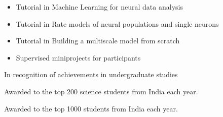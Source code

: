 \documentclass[10pt,a4paper]{altacv}
\begin{document}



\begin{itemize}
\item Tutorial in Machine Learning for neural data analysis 
\item Tutorial in Rate models of neural populations and single neurons
\item Tutorial in Building a multiscale model from scratch
\item Supervised miniprojects for participants
\end{itemize}


In recognition of achievements in undergraduate studies
\divider

Awarded to the top 200 science students from India each year.
\divider

Awarded to the top 1000 students from India each year.




%
%
%
\end{document}
